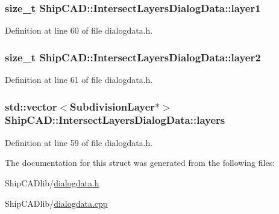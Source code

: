 \subsubsection[{\texorpdfstring{layer1}{layer1}}]{\setlength{\rightskip}{0pt plus 5cm}size\+\_\+t Ship\+C\+A\+D\+::\+Intersect\+Layers\+Dialog\+Data\+::layer1}\hypertarget{structShipCAD_1_1IntersectLayersDialogData_a2a06240ead3bc2d61dbc5bb3eb21ea99}{}\label{structShipCAD_1_1IntersectLayersDialogData_a2a06240ead3bc2d61dbc5bb3eb21ea99}


Definition at line 60 of file dialogdata.\+h.

\subsubsection[{\texorpdfstring{layer2}{layer2}}]{\setlength{\rightskip}{0pt plus 5cm}size\+\_\+t Ship\+C\+A\+D\+::\+Intersect\+Layers\+Dialog\+Data\+::layer2}\hypertarget{structShipCAD_1_1IntersectLayersDialogData_ad138f2eea90f7bac0a9c331375b1704a}{}\label{structShipCAD_1_1IntersectLayersDialogData_ad138f2eea90f7bac0a9c331375b1704a}


Definition at line 61 of file dialogdata.\+h.

\subsubsection[{\texorpdfstring{layers}{layers}}]{\setlength{\rightskip}{0pt plus 5cm}std\+::vector$<${\bf Subdivision\+Layer}$\ast$$>$ Ship\+C\+A\+D\+::\+Intersect\+Layers\+Dialog\+Data\+::layers}\hypertarget{structShipCAD_1_1IntersectLayersDialogData_a4eaea862a9ce61c04b6a1d0b972ca9c1}{}\label{structShipCAD_1_1IntersectLayersDialogData_a4eaea862a9ce61c04b6a1d0b972ca9c1}


Definition at line 59 of file dialogdata.\+h.



The documentation for this struct was generated from the following files\+:\begin{DoxyCompactItemize}
\item 
Ship\+C\+A\+Dlib/\hyperlink{dialogdata_8h}{dialogdata.\+h}\item 
Ship\+C\+A\+Dlib/\hyperlink{dialogdata_8cpp}{dialogdata.\+cpp}\end{DoxyCompactItemize}
